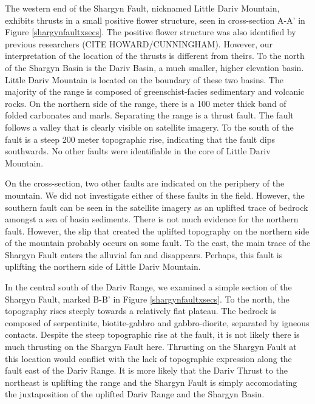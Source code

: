 \documentclass[10pt,a4paper]{article}
\begin{document}
The western end of the Shargyn Fault, nicknamed Little Dariv Mountain, exhibits thrusts in a small positive flower structure, seen in cross-section A-A' in Figure \ref{shargynfaultxsecs}. The positive flower structure was also identified by previous researchers (CITE HOWARD/CUNNINGHAM). However, our interpretation of the location of the thrusts is different from theirs. To the north of the Shargyn Basin is the Dariv Basin, a much smaller, higher elevation basin. Little Dariv Mountain is located on the boundary of these two basins. The majority of the range is composed of greenschist-facies sedimentary and volcanic rocks. On the northern side of the range, there is a 100 meter thick band of folded carbonates and marls. Separating the range is a thrust fault. The fault follows a valley that is clearly visible on satellite imagery. To the south of the fault is a steep 200 meter topographic rise, indicating that the fault dips southwards. No other faults were identifiable in the core of Little Dariv Mountain. 

On the cross-section, two other faults are indicated on the periphery of the mountain. We did not investigate either of these faults in the field. However, the southern fault can be seen in the satellite imagery as an uplifted trace of bedrock amongst a sea of basin sediments. There is not much evidence for the northern fault. However, the slip that created the uplifted topography on the northern side of the mountain probably occurs on some fault. To the east, the main trace of the Shargyn Fault enters the alluvial fan and disappears. Perhaps, this fault is uplifting the northern side of Little Dariv Mountain. 

In the central south of the Dariv Range, we examined a simple section of the Shargyn Fault, marked B-B' in Figure \ref{shargynfaultxsecs}. To the north, the topography rises steeply towards a relatively flat plateau. The bedrock is composed of serpentinite, biotite-gabbro and gabbro-diorite, separated by igneous contacts. Despite the steep topographic rise at the fault, it is not likely there is much thrusting on the Shargyn Fault here. Thrusting on the Shargyn Fault at this location would conflict with the lack of topographic expression along the fault east of the Dariv Range. It is more likely that the Dariv Thrust to the northeast is uplifting the range and the Shargyn Fault is simply accomodating the juxtaposition of the uplifted Dariv Range and the Shargyn Basin. 
\end{document}
